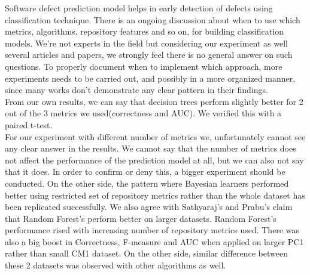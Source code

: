 Software defect prediction model helps in early detection of defects using classification technique. There is an ongoing discussion about when to use which metrics, algorithms, repository features and so on, for building classification models. We're not experts in the field but considering our experiment as well several articles and papers, we strongly feel there is no general answer on such questions. To properly document when to implement which approach, more experiments needs to be carried out, and possibly in a more organized manner, since many works don't demonstrate any clear pattern in their findings.\\
From our own results, we can say that decision trees perform slightly better for 2 out of the 3 metrics we used(correctness and AUC). We verified this with a paired t-test. \\ For our experiment with different number of metrics we, unfortunately cannot see any clear answer in the results. We cannot say that the number of metrics does not affect the performance of the prediction model at all, but we can also not say that it does. In order to confirm or deny this, a bigger experiment should be conducted.  On the other side, the pattern where Bayesian learners performed better using restricted set of repository metrics rather than the whole dataset has been replicated successfully. 
We also agree with Sathyaraj's and Prabu's claim\cite{sathyaraj2015approach} that Random Forest's perform better on larger datasets. Random Forest's performance rised with increasing number of repository metrics used. There was also a big boost in Correctness, F-measure and AUC when applied on larger PC1 rather than small CM1 dataset. On the other side, similar difference between these 2 datasets was observed with other algorithms as well.